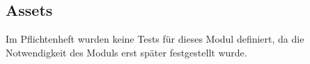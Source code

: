 \subsection{Assets}
Im Pflichtenheft wurden keine Tests für dieses Modul definiert,
da die Notwendigkeit des Moduls erst später festgestellt wurde.